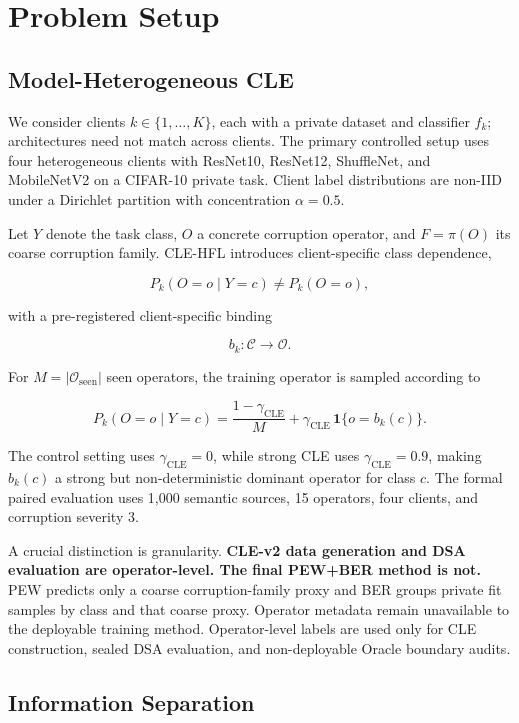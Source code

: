 \section{Problem Setup}

\subsection{Model-Heterogeneous CLE}

We consider clients \(k\in\{1,\ldots,K\}\), each with a private dataset and classifier \(f_k\); architectures need not match across clients. The primary controlled setup uses four heterogeneous clients with ResNet10, ResNet12, ShuffleNet, and MobileNetV2 on a CIFAR-10 private task. Client label distributions are non-IID under a Dirichlet partition with concentration \(\alpha=0.5\).

Let \(Y\) denote the task class, \(O\) a concrete corruption operator, and \(F=\pi(O)\) its coarse corruption family. CLE-HFL introduces client-specific class dependence,

\[
P_k(O=o\mid Y=c)\neq P_k(O=o),
\]

with a pre-registered client-specific binding

\[
b_k:\mathcal C\rightarrow\mathcal O.
\]

For \(M=|\mathcal O_{\mathrm{seen}}|\) seen operators, the training operator is sampled according to

\[
P_k(O=o\mid Y=c)
=\frac{1-\gamma_{\mathrm{CLE}}}{M}
+\gamma_{\mathrm{CLE}}\,\mathbf 1\{o=b_k(c)\}.
\]

The control setting uses \(\gamma_{\mathrm{CLE}}=0\), while strong CLE uses \(\gamma_{\mathrm{CLE}}=0.9\), making \(b_k(c)\) a strong but non-deterministic dominant operator for class \(c\). The formal paired evaluation uses 1,000 semantic sources, 15 operators, four clients, and corruption severity 3.

A crucial distinction is granularity. \textbf{CLE-v2 data generation and DSA evaluation are operator-level. The final PEW+BER method is not.} PEW predicts only a coarse corruption-family proxy and BER groups private fit samples by class and that coarse proxy. Operator metadata remain unavailable to the deployable training method. Operator-level labels are used only for CLE construction, sealed DSA evaluation, and non-deployable Oracle boundary audits.

\subsection{Information Separation}

